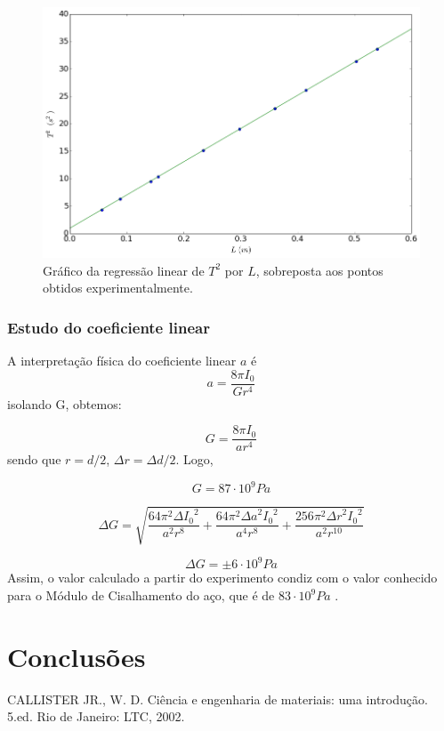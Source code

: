 \documentclass[12pt,a4paper]{article}
\begin{document}
\begin{figure}[!htbp]
 
\includegraphics[scale=0.6]{graf1.png}
\caption{Gráfico da regressão linear de $T^2$ por $L$, sobreposta aos pontos obtidos experimentalmente.} 
\end{figure} 
\subsubsection{Estudo do coeficiente linear}

A interpretação física do coeficiente linear $a$ é 
$$ a = \frac{8\pi I_0}{G r^4}  $$
isolando G, obtemos:

$$ G = \frac{8\pi I_0}{a r^4}  $$
sendo que $r = d/2$, $\Delta r = {\Delta d}/{2} $. Logo,

$$ G =  87 \cdot 10^9 Pa $$

$$ \Delta G = \sqrt{\frac{64 \pi^{2} {\Delta I_0}^{2}}{a^{2} r^{8}} + \frac{64 \pi^{2} {\Delta a}^{2} {I_0}^{2}}{a^{4} r^{8}} + \frac{256 \pi^{2} {\Delta r}^{2} {I_0}^{2}}{a^{2} r^{10}}} $$


$$ \Delta G = \pm 6 \cdot 10^9 Pa$$
Assim, o valor calculado a partir do experimento condiz com o valor conhecido para o Módulo de Cisalhamento do aço, que é de $83 \cdot 10^9 Pa$ \cite{callister}.





\section{Conclusões}



\begin{thebibliography}{9}

  CALLISTER JR., W. D. Ciência e engenharia de materiais: uma introdução. 5.ed. Rio de Janeiro: LTC, 2002.

\end{thebibliography}
\end{document}
